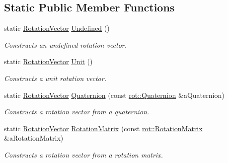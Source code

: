 \subsection*{Static Public Member Functions}
\begin{DoxyCompactItemize}
\item 
static \hyperlink{classlibrary_1_1math_1_1geom_1_1d3_1_1trf_1_1rot_1_1_rotation_vector}{Rotation\+Vector} \hyperlink{classlibrary_1_1math_1_1geom_1_1d3_1_1trf_1_1rot_1_1_rotation_vector_a4ab50dc44c938485c102c4c70006c04b}{Undefined} ()
\begin{DoxyCompactList}\small\item\em Constructs an undefined rotation vector. \end{DoxyCompactList}\item 
static \hyperlink{classlibrary_1_1math_1_1geom_1_1d3_1_1trf_1_1rot_1_1_rotation_vector}{Rotation\+Vector} \hyperlink{classlibrary_1_1math_1_1geom_1_1d3_1_1trf_1_1rot_1_1_rotation_vector_ae8dcd99b54ffcffee6906b526a8d2769}{Unit} ()
\begin{DoxyCompactList}\small\item\em Constructs a unit rotation vector. \end{DoxyCompactList}\item 
static \hyperlink{classlibrary_1_1math_1_1geom_1_1d3_1_1trf_1_1rot_1_1_rotation_vector}{Rotation\+Vector} \hyperlink{classlibrary_1_1math_1_1geom_1_1d3_1_1trf_1_1rot_1_1_rotation_vector_a6da4ed18679e28816896de413e04ed79}{Quaternion} (const \hyperlink{classlibrary_1_1math_1_1geom_1_1d3_1_1trf_1_1rot_1_1_quaternion}{rot\+::\+Quaternion} \&a\+Quaternion)
\begin{DoxyCompactList}\small\item\em Constructs a rotation vector from a quaternion. \end{DoxyCompactList}\item 
static \hyperlink{classlibrary_1_1math_1_1geom_1_1d3_1_1trf_1_1rot_1_1_rotation_vector}{Rotation\+Vector} \hyperlink{classlibrary_1_1math_1_1geom_1_1d3_1_1trf_1_1rot_1_1_rotation_vector_a397807ffe12bb72cd788660b83bdf7b3}{Rotation\+Matrix} (const \hyperlink{classlibrary_1_1math_1_1geom_1_1d3_1_1trf_1_1rot_1_1_rotation_matrix}{rot\+::\+Rotation\+Matrix} \&a\+Rotation\+Matrix)
\begin{DoxyCompactList}\small\item\em Constructs a rotation vector from a rotation matrix. \end{DoxyCompactList}\end{DoxyCompactItemize}
